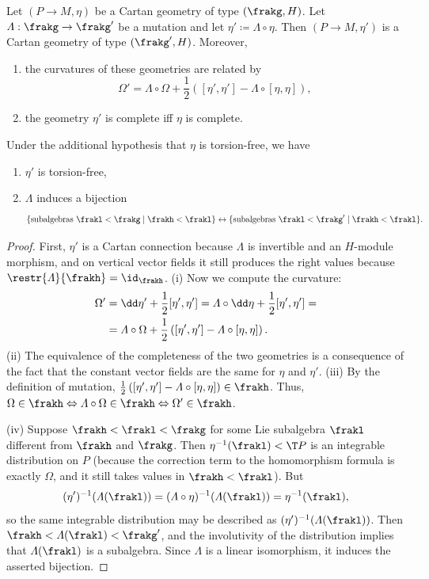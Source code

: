 \begin{prop}
    Let $(P\to M,\eta)$ be a Cartan geometry of type $(\frakg,H)$. Let $\varLambda:\frakg\to\frakg'$ be a mutation and let $\eta'\coloneqq \varLambda\circ\eta$. Then $(P\to M,\eta')$ is a Cartan geometry of type $(\frakg',H)$. Moreover, 
    \begin{enumerate}[label=(\roman*)]
        \item the curvatures of these geometries are related by 
        \[\Omega'=\varLambda\circ \Omega+\frac12\left([\eta',\eta']-\varLambda\circ [\eta,\eta]\right),\]
        \item the geometry $\eta'$ is complete iff $\eta$ is complete.
    \end{enumerate}
    Under the additional hypothesis that $\eta$ is torsion-free, we have 
    \begin{enumerate}[resume,label=(\roman*)]
        \item $\eta'$ is torsion-free,
        \item $\varLambda$ induces a bijection 
        \[\{\text{subalgebras } \frakl<\frakg\mid \frakh<\frakl\}\leftrightarrow \{\text{subalgebras } \frakl<\frakg'\mid \frakh<\frakl\}.\]
    \end{enumerate}
\end{prop}
\begin{proof}
    First, $\eta'$ is a Cartan connection because $\varLambda$ is invertible and an $H$-module morphism, and on vertical vector fields it still produces the right values because $\restr{\varLambda}{\frakh}=\id_\frakh$. (i) Now we compute the curvature:
    \begin{align}
        \Omega'&=\dd\eta'+\frac12[\eta',\eta']=\varLambda\circ \dd\eta+\frac12[\eta',\eta']=\notag\\
        &=\varLambda\circ \Omega+\frac12\left([\eta',\eta']-\varLambda\circ [\eta,\eta]\right).
    \end{align}
    (ii) The equivalence of the completeness of the two geometries is a consequence of the fact that the constant vector fields are the same for $\eta$ and $\eta'$. (iii) By the definition of mutation, $\frac12\left([\eta',\eta']-\varLambda\circ [\eta,\eta]\right)\in\frakh$. Thus, $\Omega\in \frakh\Leftrightarrow \varLambda\circ \Omega\in \frakh\Leftrightarrow \Omega'\in\frakh$. 

    (iv) Suppose $\frakh<\frakl<\frakg $ for some Lie subalgebra $\frakl$ different from $\frakh$ and $\frakg$. Then $\eta^{-1}(\frakl)<\T P$ is an integrable distribution on $P$ (because the correction term to the homomorphism formula is exactly $\Omega$, and it still takes values in $\frakh<\frakl$). But 
    \[(\eta')^{-1}(\varLambda(\frakl))=(\varLambda\circ \eta)^{-1}(\varLambda(\frakl))=\eta^{-1}(\frakl),\]
    so the same integrable distribution may be described as $(\eta')^{-1}(\varLambda(\frakl))$. Then $\frakh<\varLambda(\frakl)<\frakg'$, and the involutivity of the distribution implies that $\varLambda(\frakl)$ is a subalgebra. Since $\varLambda$ is a linear isomorphism, it induces the asserted bijection.
\end{proof}

